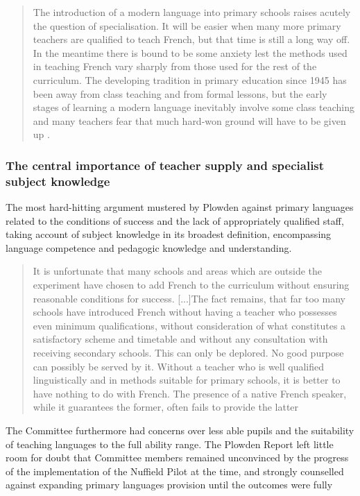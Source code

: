 \documentclass[output=paper]{langscibook}
\begin{document}
\begin{quote}
The introduction of a modern language into primary schools raises acutely the question of specialisation. It will be easier when many more primary teachers are qualified to teach French, but that time is still a long way off. In the meantime there is bound to be some anxiety lest the methods used in teaching French vary sharply from those used for the rest of the curriculum. The developing tradition in primary education since 1945 has been away from class teaching and from formal lessons, but the early stages of learning a modern language inevitably involve some class teaching and many teachers fear that much hard-won ground will have to be given up \citep[617 (iv)]{Plowden1967}.
\end{quote}

\subsubsection{The central importance of teacher supply and specialist subject knowledge}

The most hard-hitting argument mustered by Plowden against primary lang\-uages related to the conditions of success and the lack of appropriately qualified staff, taking account of subject knowledge in its broadest definition, encompassing language competence and pedagogic knowledge and understanding. 

\begin{quotation}
It is unfortunate that many schools and areas which are outside the experiment have chosen to add French to the curriculum without ensuring reasonable conditions for success. [...]The fact remains, that far too many schools have introduced French without having a teacher who possesses even minimum qualifications, without consideration of what constitutes a satisfactory scheme and timetable and without any consultation with receiving secondary schools. This can only be deplored. No good purpose can possibly be served by it. Without a teacher who is well qualified linguistically and in methods suitable for primary schools, it is better to have nothing to do with French. The presence of a native French speaker, while it guarantees the former, often fails to provide the latter \citep[617 (v)]{Plowden1967}\end{quotation}

The Committee furthermore had concerns over less able pupils and the suitability of teaching languages to the full ability range. The Plowden Report left little room for doubt that Committee members remained unconvinced by the progress of the implementation of the Nuffield Pilot at the time, and strongly counselled against expanding primary languages provision until the outcomes were fully known \citep[618]{Plowden1967}.
\end{document}
